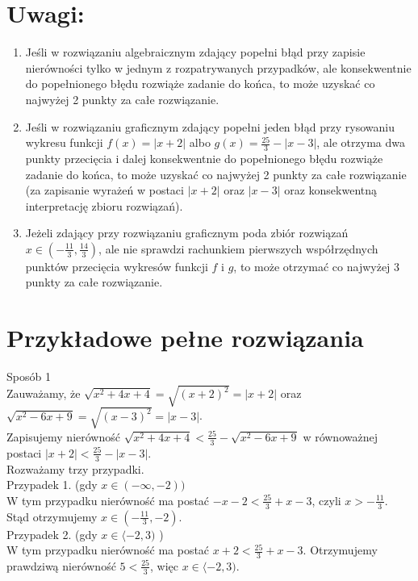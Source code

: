 \documentclass[10pt]{article}
\begin{document}
\section*{Uwagi:}
\begin{enumerate}
  \item Jeśli w rozwiązaniu algebraicznym zdający popełni błąd przy zapisie nierówności tylko w jednym z rozpatrywanych przypadków, ale konsekwentnie do popełnionego błędu rozwiąże zadanie do końca, to może uzyskać co najwyżej 2 punkty za całe rozwiązanie.
  \item Jeśli w rozwiązaniu graficznym zdający popełni jeden błąd przy rysowaniu wykresu funkcji $f(x)=|x+2|$ albo $g(x)=\frac{25}{3}-|x-3|$, ale otrzyma dwa punkty przecięcia i dalej konsekwentnie do popełnionego błędu rozwiąże zadanie do końca, to może uzyskać co najwyżej 2 punkty za całe rozwiązanie (za zapisanie wyrażeń w postaci $|x+2|$ oraz $|x-3|$ oraz konsekwentną interpretację zbioru rozwiązań).
  \item Jeżeli zdający przy rozwiązaniu graficznym poda zbiór rozwiązań $x \in\left(-\frac{11}{3}, \frac{14}{3}\right)$, ale nie sprawdzi rachunkiem pierwszych współrzędnych punktów przecięcia wykresów funkcji $f$ i $g$, to może otrzymać co najwyżej 3 punkty za całe rozwiązanie.
\end{enumerate}

\section*{Przykładowe pełne rozwiązania}
Sposób 1\\
Zauważamy, że $\sqrt{x^{2}+4 x+4}=\sqrt{(x+2)^{2}}=|x+2|$ oraz\\
$\sqrt{x^{2}-6 x+9}=\sqrt{(x-3)^{2}}=|x-3|$.\\
Zapisujemy nierówność $\sqrt{x^{2}+4 x+4}<\frac{25}{3}-\sqrt{x^{2}-6 x+9}$ w równoważnej postaci $|x+2|<\frac{25}{3}-|x-3|$.\\
Rozważamy trzy przypadki.\\
Przypadek 1. (gdy $x \in(-\infty,-2))$\\
W tym przypadku nierówność ma postać $-x-2<\frac{25}{3}+x-3$, czyli $x>-\frac{11}{3}$.\\
Stąd otrzymujemy $x \in\left(-\frac{11}{3},-2\right)$.\\
Przypadek 2. (gdy $x \in\langle-2,3)$ )\\
W tym przypadku nierówność ma postać $x+2<\frac{25}{3}+x-3$. Otrzymujemy prawdziwą nierówność $5<\frac{25}{3}$, więc $x \in\langle-2,3)$.
\end{document}

